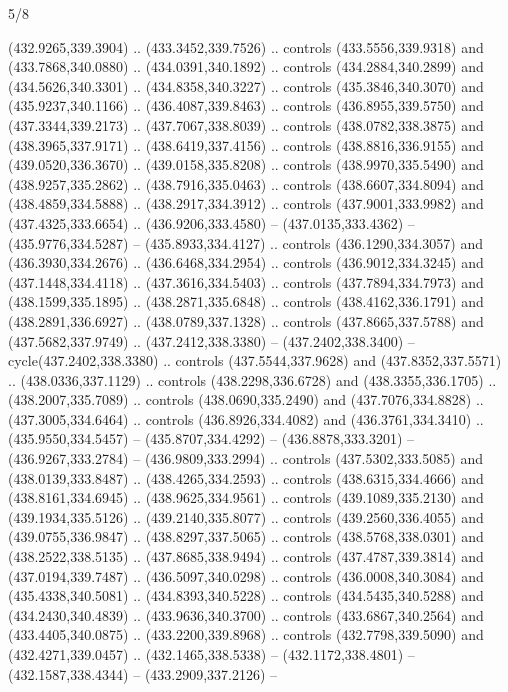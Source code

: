 \begin{flagdescription}{5/8}
\begin{scope}[shift={(0.5\flaglength,0.5\flagwidth)},scale=\flagwidth*\stretchfactor/820]
\begin{scope}[scale=1.84,xshift=-135mm,yshift=84mm]
\begin{scope}[y=0.80pt, x=0.80pt, yscale=-1, xscale=1]
\begin{scope}[cm={{1.01416,0.0,0.0,1.033,(-6.79641,-9.89449)}}]
\begin{scope}[draw=c485654,fill=c8c959d,line width=0.087\lw]
  (432.9265,339.3904) .. (433.3452,339.7526) .. controls (433.5556,339.9318) and
  (433.7868,340.0880) .. (434.0391,340.1892) .. controls (434.2884,340.2899) and
  (434.5626,340.3301) .. (434.8358,340.3227) .. controls (435.3846,340.3070) and
  (435.9237,340.1166) .. (436.4087,339.8463) .. controls (436.8955,339.5750) and
  (437.3344,339.2173) .. (437.7067,338.8039) .. controls (438.0782,338.3875) and
  (438.3965,337.9171) .. (438.6419,337.4156) .. controls (438.8816,336.9155) and
  (439.0520,336.3670) .. (439.0158,335.8208) .. controls (438.9970,335.5490) and
  (438.9257,335.2862) .. (438.7916,335.0463) .. controls (438.6607,334.8094) and
  (438.4859,334.5888) .. (438.2917,334.3912) .. controls (437.9001,333.9982) and
  (437.4325,333.6654) .. (436.9206,333.4580) -- (437.0135,333.4362) --
  (435.9776,334.5287) -- (435.8933,334.4127) .. controls (436.1290,334.3057) and
  (436.3930,334.2676) .. (436.6468,334.2954) .. controls (436.9012,334.3245) and
  (437.1448,334.4118) .. (437.3616,334.5403) .. controls (437.7894,334.7973) and
  (438.1599,335.1895) .. (438.2871,335.6848) .. controls (438.4162,336.1791) and
  (438.2891,336.6927) .. (438.0789,337.1328) .. controls (437.8665,337.5788) and
  (437.5682,337.9749) .. (437.2412,338.3380) -- (437.2402,338.3400) --
  cycle(437.2402,338.3380) .. controls (437.5544,337.9628) and
  (437.8352,337.5571) .. (438.0336,337.1129) .. controls (438.2298,336.6728) and
  (438.3355,336.1705) .. (438.2007,335.7089) .. controls (438.0690,335.2490) and
  (437.7076,334.8828) .. (437.3005,334.6464) .. controls (436.8926,334.4082) and
  (436.3761,334.3410) .. (435.9550,334.5457) -- (435.8707,334.4292) --
  (436.8878,333.3201) -- (436.9267,333.2784) -- (436.9809,333.2994) .. controls
  (437.5302,333.5085) and (438.0139,333.8487) .. (438.4265,334.2593) .. controls
  (438.6315,334.4666) and (438.8161,334.6945) .. (438.9625,334.9561) .. controls
  (439.1089,335.2130) and (439.1934,335.5126) .. (439.2140,335.8077) .. controls
  (439.2560,336.4055) and (439.0755,336.9847) .. (438.8297,337.5065) .. controls
  (438.5768,338.0301) and (438.2522,338.5135) .. (437.8685,338.9494) .. controls
  (437.4787,339.3814) and (437.0194,339.7487) .. (436.5097,340.0298) .. controls
  (436.0008,340.3084) and (435.4338,340.5081) .. (434.8393,340.5228) .. controls
  (434.5435,340.5288) and (434.2430,340.4839) .. (433.9636,340.3700) .. controls
  (433.6867,340.2564) and (433.4405,340.0875) .. (433.2200,339.8968) .. controls
  (432.7798,339.5090) and (432.4271,339.0457) .. (432.1465,338.5338) --
  (432.1172,338.4801) -- (432.1587,338.4344) -- (433.2909,337.2126) --

\end{scope}
\end{scope}
\end{scope}
\end{scope}
\end{scope}
\end{flagdescription}
